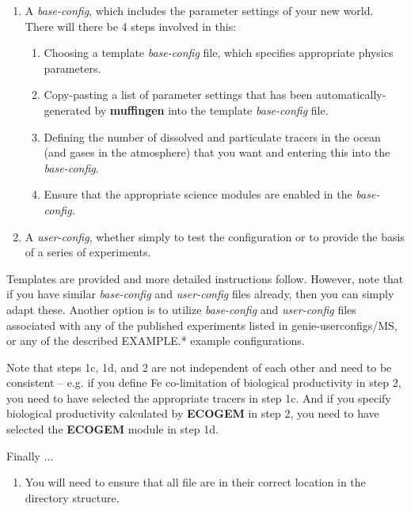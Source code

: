 \documentclass[11pt,fleqn]{book} %
\begin{document}
\begin{enumerate}[noitemsep]
\vspace{1mm}
\item A \textit{base-config}, which includes the parameter settings of your new world.
\\There will there be 4 steps involved in this:
\begin{enumerate}[noitemsep]
\item Choosing a template \textit{base-config} file, which specifies appropriate physics parameters.
\item Copy-pasting a list of parameter settings that has been automatically-generated by \textbf{muffingen} into the template\textit{ base-config} file.
\item Defining the number of dissolved and particulate tracers in the ocean (and gases in the atmosphere) that you want and entering this into the \textit{base-config}.
\item Ensure that the appropriate science modules are enabled in the \textit{base-config}.
\end{enumerate}
\vspace{1mm}
\item A \textit{user-config}, whether simply to test the configuration or to provide the basis of a series of experiments.
\end{enumerate}
\vspace{1mm}

Templates are provided and more detailed instructions follow. However, note that if you have similar \textit{base-config} and \textit{user-config} files already, then you can simply adapt these. Another option is to utilize \textit{base-config} and \textit{user-config} files associated with any of the published experiments listed in \textsf{\footnotesize genie-userconfigs/MS}, or any of the described \textsf{\footnotesize EXAMPLE.*} example configurations.

Note that steps 1c, 1d, and 2 are not independent of each other and need to be consistent -- e.g. if you define Fe co-limitation of biological productivity in step 2, you need to have selected the appropriate tracers in step 1c. And if you specify biological productivity calculated by \textbf{ECOGEM} in step 2, you need to have selected the \textbf{ECOGEM} module in step 1d.

Finally ...
\begin{enumerate}[noitemsep]
\vspace{1mm}
\setcounter{enumi}{2}
\item You will need to ensure that all file are in their correct location in the directory structure.
\end{enumerate}
\vspace{1mm}
\end{document}

